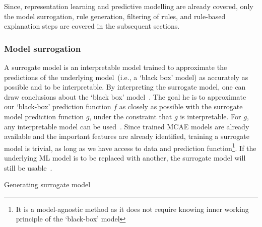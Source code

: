 \hspace*{3.5mm} Since, representation learning and predictive modelling are already covered, only the model surrogation, rule generation, filtering of rules, and rule-based explanation steps are covered in the subsequent sections. 

\subsubsection{Model surrogation}
A surrogate model is an interpretable model trained to approximate the predictions of the underlying model~(i.e., a `black box' model) as accurately as possible and to be interpretable. By interpreting the surrogate model, one can draw conclusions about the `black box' model~\cite{molnar2019interpretable}. The goal he is to approximate our `black-box' prediction function $f$ as closely as possible with the surrogate model prediction function $g$, under the constraint that $g$ is interpretable. For $g$, any interpretable model can be used~\cite{molnar2019interpretable}. Since trained MCAE models are already available and the important features are already identified, training a surrogate model is trivial, as long as we have access to data and prediction function\footnote{It is a model-agnostic method as it does not require knowing inner working principle of the `black-box' model}. If the underlying ML model is to be replaced with another, the surrogate model will still be usable~\cite{molnar2019interpretable}. 

\begin{algorithm*}[h]
\caption{Generating surrogate model}
\small{
    \DontPrintSemicolon {}%
    \BlankLine%
    \BlankLine%
    }
     \label{algo:surrogate_model_generation}
\end{algorithm*}

